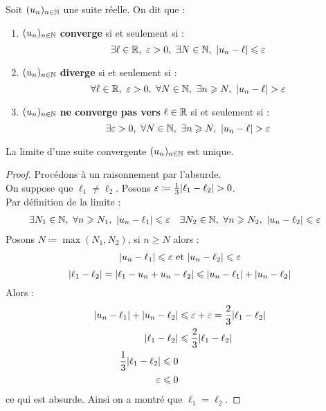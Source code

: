 \begin{definition}
    Soit $(u_n)_{n \in \mathbb{N}}$ une suite réelle. On dit que :
    \begin{enumerate}
        \item $(u_n)_{n \in \mathbb{N}}$ \textbf{converge} si et seulement si : 
        \[ \exists \ell \in \R,\ \varepsilon > 0,\ \exists N \in \N,\ \abs{u_n - \ell} \leq \varepsilon \]
        \item $(u_n)_{n \in \mathbb{N}}$ \textbf{diverge} si et seulement si : 
        \[ \forall \ell \in \R,\ \varepsilon > 0,\ \forall N \in \N,\ \exists n \geq N,\ \abs{u_n - \ell} > \varepsilon \]
        \item $(u_n)_{n \in \mathbb{N}}$ \textbf{ne converge pas vers} $\ell \in \mathbb{R}$ si et seulement si : 
        \[ \exists \varepsilon > 0,\ \forall N \in \mathbb{N},\ \exists n \geqslant N,\ \abs{u_n - \ell} > \varepsilon \]
    \end{enumerate}
\end{definition}

\begin{theorem}
    La limite d'une suite convergente $(u_n)_{n \in \mathbb{N}}$ est unique.
\end{theorem}

\begin{proof}
    Procédons à un raisonnement par l'absurde.
    \\
    On suppose que $\ell_1 \neq \ell_2$. Posons $\varepsilon \coloneqq \frac{1}{3} \abs{\ell_1 - \ell_2} > 0$.
    \\
    Par définition de la limite :
    \begin{align*}
        &\exists N_1 \in \mathbb{N},\ \forall n \geqslant N_1,\ \abs{u_n - \ell_1} \leqslant \varepsilon 
        &
        &\exists N_2 \in \mathbb{N},\ \forall n \geqslant N_2,\ \abs{u_n - \ell_2} \leqslant \varepsilon
    \end{align*}
    Posons $N \coloneqq \max(N_1, N_2)$, si $n \geq N$ alors :
    \begin{align*}
        \abs{u_n - \ell_1} \leqslant \varepsilon \text{ et } \abs{u_n - \ell_2} \leqslant \varepsilon
    \end{align*}
    \[ \abs{\ell_1 - \ell_2} = \abs{\ell_1 - u_n + u_n - \ell_2} \leqslant \abs{u_n - \ell_1} + \abs{u_n - \ell_2} \]
    Alors : 
    \begin{align*}
        \abs{u_n - \ell_1} + \abs{u_n - \ell_2} &\leqslant \varepsilon + \varepsilon = \frac{2}{3} \abs{\ell_1 - \ell_2} \\
        \abs{\ell_1 - \ell_2} &\leqslant \frac{2}{3} \abs{\ell_1 - \ell_2} \\
        \frac{1}{3} \abs{\ell_1 - \ell_2} \leqslant 0 \\
        \varepsilon \leqslant 0
    \end{align*}
    ce qui est absurde. Ainsi on a montré que $\ell_1 = \ell_2$.
\end{proof}

